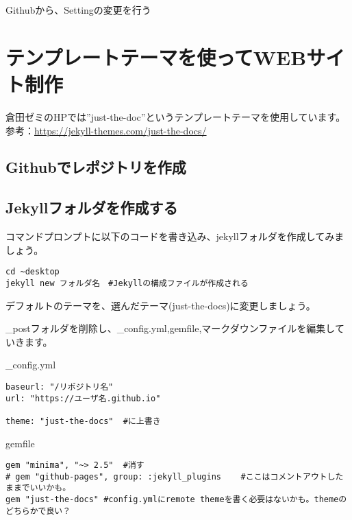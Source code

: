 \documentclass[
]{book}
\begin{document}
Githubから、Settingの変更を行う

\hypertarget{ux30c6ux30f3ux30d7ux30ecux30fcux30c8ux30c6ux30fcux30deux3092ux4f7fux3063ux3066webux30b5ux30a4ux30c8ux5236ux4f5c}{%
\chapter{テンプレートテーマを使ってWEBサイト制作}\label{ux30c6ux30f3ux30d7ux30ecux30fcux30c8ux30c6ux30fcux30deux3092ux4f7fux3063ux3066webux30b5ux30a4ux30c8ux5236ux4f5c}}

倉田ゼミのHPでは''just-the-doc''というテンプレートテーマを使用しています。
参考：\url{https://jekyll-themes.com/just-the-docs/}

\hypertarget{githubux3067ux30ecux30ddux30b8ux30c8ux30eaux3092ux4f5cux6210}{%
\section{Githubでレポジトリを作成}\label{githubux3067ux30ecux30ddux30b8ux30c8ux30eaux3092ux4f5cux6210}}

\hypertarget{jekyllux30d5ux30a9ux30ebux30c0ux3092ux4f5cux6210ux3059ux308b}{%
\section{Jekyllフォルダを作成する}\label{jekyllux30d5ux30a9ux30ebux30c0ux3092ux4f5cux6210ux3059ux308b}}

コマンドプロンプトに以下のコードを書き込み、jekyllフォルダを作成してみましょう。

\begin{verbatim}
cd ~desktop
jekyll new フォルダ名　#Jekyllの構成ファイルが作成される
\end{verbatim}

デフォルトのテーマを、選んだテーマ(just-the-docs)に変更しましょう。

\_postフォルダを削除し、\_config.yml,gemfile,マークダウンファイルを編集していきます。

\_config.yml

\begin{verbatim}
baseurl: "/リポジトリ名" 
url: "https://ユーザ名.github.io" 

theme: "just-the-docs"	#に上書き
\end{verbatim}

gemfile

\begin{verbatim}
gem "minima", "~> 2.5"	#消す
# gem "github-pages", group: :jekyll_plugins	#ここはコメントアウトしたままでいいかも。
gem "just-the-docs"	#config.ymlにremote themeを書く必要はないかも。themeのどちらかで良い？
\end{verbatim}
\end{document}
